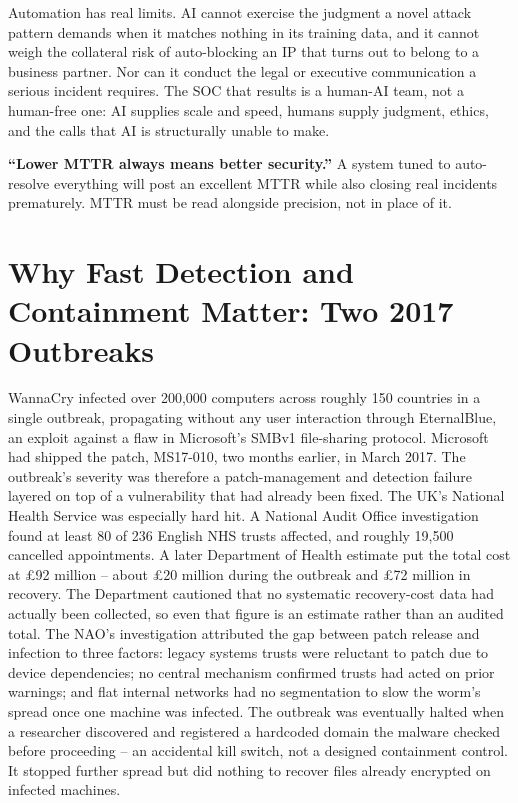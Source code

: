 Automation has real limits. AI cannot exercise the judgment a novel attack pattern demands when it
matches nothing in its training data, and it cannot weigh the collateral risk of auto-blocking an
IP that turns out to belong to a business partner. Nor can it conduct the legal or executive
communication a serious incident requires. The SOC that results is a human-AI team, not a human-free one: AI
supplies scale and speed, humans supply judgment, ethics, and the calls that AI is structurally
unable to make.

\begin{misconception}
\textbf{``Lower MTTR always means better security.''} A system tuned to auto-resolve everything
will post an excellent MTTR while also closing real incidents prematurely. MTTR must be read
alongside precision, not in place of it.
\end{misconception}

\section{Why Fast Detection and Containment Matter: Two 2017 Outbreaks}

\begin{example}
WannaCry infected over 200,000 computers across roughly 150 countries in a single
outbreak, propagating without any user interaction through EternalBlue, an exploit against a flaw
in Microsoft's SMBv1 file-sharing protocol. Microsoft had shipped the patch,
MS17-010, two months earlier, in March 2017. The outbreak's severity was therefore a
patch-management and detection failure layered on top of a vulnerability that had already been
fixed. The UK's National Health Service was especially hard hit. A National Audit Office
investigation found at least 80 of 236 English NHS trusts affected, and roughly 19,500 cancelled
appointments. A later Department of Health estimate put the total cost at
\pounds{}92 million -- about \pounds{}20 million during the outbreak and \pounds{}72 million in
recovery. The Department cautioned that no systematic recovery-cost data had
actually been collected, so even that figure is an estimate rather than an audited total. The
NAO's investigation attributed the gap between patch release and infection to three factors: legacy
systems trusts were reluctant to patch due to device dependencies; no central mechanism confirmed
trusts had acted on prior warnings; and flat internal networks had no segmentation to slow the
worm's spread once one machine was infected. The outbreak was eventually halted when a researcher
discovered and registered a hardcoded domain the malware checked before proceeding -- an accidental
kill switch, not a designed containment control. It stopped further spread but did nothing to
recover files already encrypted on infected machines.
\end{example}

